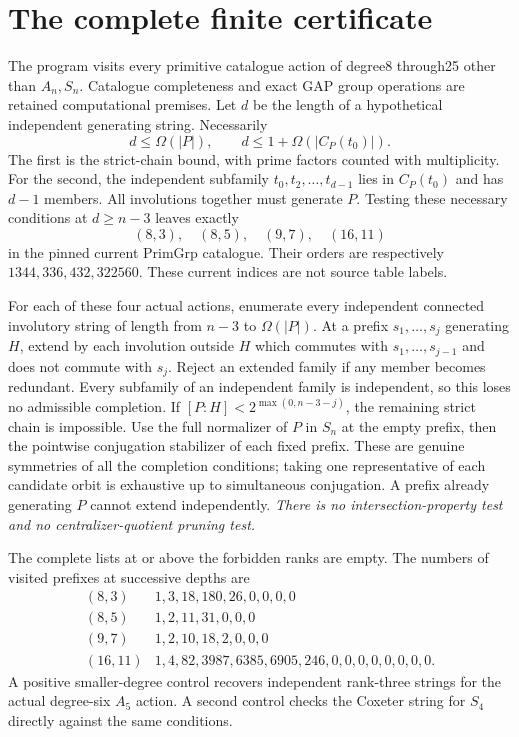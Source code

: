 \documentclass[11pt,a4paper]{article}
\begin{document}
\section{The complete finite certificate}
The program visits every primitive catalogue action of degree8 through25
other than $A_n,S_n$. Catalogue completeness and exact GAP group
operations are retained computational premises. Let $d$ be the length
of a hypothetical independent generating string. Necessarily
\[
 d\le\Omega(|P|),\qquad
 d\le1+\Omega(|C_P(t_0)|).
\]
The first is the strict-chain bound, with prime factors counted with
multiplicity. For the second, the independent subfamily
$t_0,t_2,\ldots,t_{d-1}$ lies in $C_P(t_0)$ and has $d-1$ members.
All involutions together must generate $P$. Testing these necessary
conditions at $d\ge n-3$ leaves exactly
\[
 (8,3),\quad(8,5),\quad(9,7),\quad(16,11)
\]
in the pinned current PrimGrp catalogue. Their orders are respectively
$1344,336,432,322560$. These current indices are not source table labels.

For each of these four actual actions, enumerate every independent
connected involutory string of length from $n-3$ to $\Omega(|P|)$.
At a prefix $s_1,\ldots,s_j$ generating $H$, extend by each involution
outside $H$ which commutes with $s_1,\ldots,s_{j-1}$ and does not
commute with $s_j$. Reject an extended family if any member becomes
redundant. Every subfamily of an independent family is independent,
so this loses no admissible completion. If
$[P:H]<2^{\max(0,n-3-j)}$, the remaining strict chain is impossible.
Use the full normalizer of $P$ in $S_n$ at the empty prefix, then
the pointwise conjugation stabilizer of each fixed prefix. These are
genuine symmetries of all the completion conditions; taking one
representative of each candidate orbit is exhaustive up to simultaneous
conjugation. A prefix already generating $P$ cannot extend independently.
\emph{There is no intersection-property test and no
centralizer-quotient pruning test.}

The complete lists at or above the forbidden ranks are empty.
The numbers of visited prefixes at successive depths are
\[
\begin{array}{c|l}
(8,3)&1,3,18,180,26,0,0,0,0\\
(8,5)&1,2,11,31,0,0,0\\
(9,7)&1,2,10,18,2,0,0,0\\
(16,11)&1,4,82,3987,6385,6905,246,0,0,0,0,0,0,0,0.
\end{array}
\]
A positive smaller-degree control recovers independent rank-three
strings for the actual degree-six $A_5$ action. A second control checks
the Coxeter string for $S_4$ directly against the same conditions.
\end{document}
